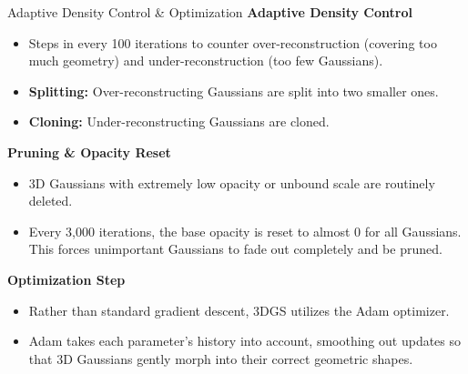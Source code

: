 \begin{frame}{Adaptive Density Control \& Optimization}
    \textbf{Adaptive Density Control}
    \begin{itemize}
        \justifying
        \item Steps in every 100 iterations to counter over-reconstruction (covering too much geometry) and under-reconstruction (too few Gaussians).
        \item \textbf{Splitting:} Over-reconstructing Gaussians are split into two smaller ones.
        \item \textbf{Cloning:} Under-reconstructing Gaussians are cloned.
    \end{itemize}

    \pause
    \vspace{0.5em}

    \textbf{Pruning \& Opacity Reset}
    \begin{itemize}
        \justifying
        \item 3D Gaussians with extremely low opacity or unbound scale are routinely deleted.
        \item Every 3,000 iterations, the base opacity is reset to almost 0 for all Gaussians. This forces unimportant Gaussians to fade out completely and be pruned.
    \end{itemize}

    \pause
    \vspace{0.5em}

    \textbf{Optimization Step}
    \begin{itemize}
        \justifying
        \item Rather than standard gradient descent, 3DGS utilizes the Adam optimizer.
        \item Adam takes each parameter's history into account, smoothing out updates so that 3D Gaussians gently morph into their correct geometric shapes.
    \end{itemize}
\end{frame}


